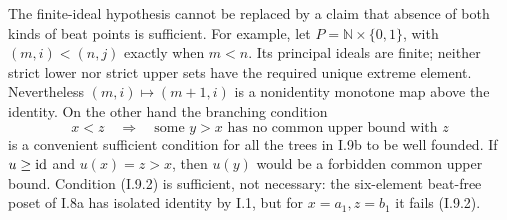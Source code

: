 The finite-ideal hypothesis cannot be replaced by a claim that
absence of both kinds of beat points is sufficient. For example,
let $P=\mathbb N\times\{0,1\}$, with
$(m,i)<(n,j)$ exactly when $m<n$. Its principal ideals are finite;
neither strict lower nor strict upper sets have the required unique
extreme element. Nevertheless $(m,i)\mapsto(m+1,i)$ is a nonidentity
monotone map above the identity. On the other hand the branching
condition
\[
 x<z\quad\Longrightarrow\quad
 \text{some }y>x\text{ has no common upper bound with }z
 \tag{I.9.2}
\]
is a convenient sufficient condition for all the trees in I.9b to
be well founded. If $u\geq\mathrm{id}$ and $u(x)=z>x$, then $u(y)$ would
be a forbidden common upper bound. Condition (I.9.2) is sufficient,
not necessary: the six-element beat-free poset of I.8a has isolated
identity by I.1, but for $x=a_1,z=b_1$ it fails (I.9.2).

